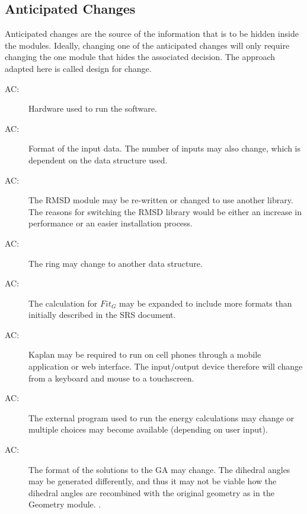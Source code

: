 \documentclass[12pt, titlepage]{article}
\newcounter{acnum}
\newcommand{\actheacnum}{AC\theacnum}
\newcommand{\progname}{Kaplan} %
\begin{document}
\subsection{Anticipated Changes} \label{SecAchange}

Anticipated changes are the source of the information that is to be hidden
inside the modules. Ideally, changing one of the anticipated changes will only
require changing the one module that hides the associated decision. The approach
adapted here is called design for
change.

\begin{description}
\item[ \actheacnum \label{acHardware}:] Hardware used to 
run the software.
\item[ \actheacnum \label{acInput}:] Format of the input 
data. The number of inputs may also change, which is dependent on the data 
structure used. 
\item[ \actheacnum \label{acRMSD}:] The RMSD module may 
be re-written or changed to use another library. The reasons for switching the 
RMSD library would be either an increase in performance or an easier 
installation process.
\item[ \actheacnum \label{acRing}:] The ring may change 
to another data structure.  
\item[ \actheacnum \label{acFit_G}:] The calculation for 
$Fit_G$ may be expanded to include more formats than initially described in the 
SRS document.

\item[ \actheacnum \label{acOutputDevice}:] \progname{} 
may be required to run on cell phones through a mobile application or web 
interface. The input/output device therefore will change from a keyboard and 
mouse to a touchscreen.
\item[ \actheacnum \label{acEnergy}:] The external 
program used to run the energy calculations may change or multiple choices may 
become available (depending on user input).
\item[ \actheacnum \label{acGeometry}:] The format of the 
solutions to the GA may change. The dihedral angles may be generated 
differently, and thus it may not be viable how the dihedral angles are 
recombined with the original geometry as in the Geometry module.
.
\end{description}
\end{document}
